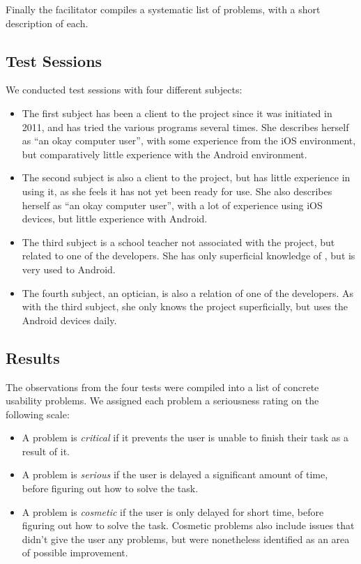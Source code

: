 Finally the facilitator compiles a systematic list of problems, with a short description of each.

\subsection{Test Sessions}
We conducted test sessions with four different subjects:
\begin{itemize}
	\item The first subject has been a client to the \giraf project since it was initiated in 2011, and has tried the various programs several times. She describes herself as ``an okay computer user'', with some experience from the iOS environment, but comparatively little experience with the Android environment. 
	\item The second subject is also a client to the \giraf project, but has little experience in using it, as she feels it has not yet been ready for use. She also describes herself as ``an okay computer user'', with a lot of experience using iOS devices, but little experience with Android. 
	\item The third subject is a school teacher not associated with the \giraf project, but related to one of the developers. She has only superficial knowledge of \giraf, but is very used to Android.
	\item The fourth subject, an optician, is also a relation of one of the developers. As with the third subject, she only knows the \giraf project superficially, but uses the Android devices daily.
\end{itemize}

\subsection{Results}
The observations from the four tests were compiled into a list of concrete usability problems. We assigned each problem a seriousness rating on the following scale:
\begin{itemize}
	\item A problem is \textit{critical} if it prevents the user is unable to finish their task as a result of it.
	\item A problem is \textit{serious} if the user is delayed a significant amount of time, before figuring out how to solve the task.
	\item A problem is \textit{cosmetic} if the user is only delayed for short time, before figuring out how to solve the task. Cosmetic problems also include issues that didn't give the user any problems, but were nonetheless identified as an area of possible improvement.
\end{itemize}

